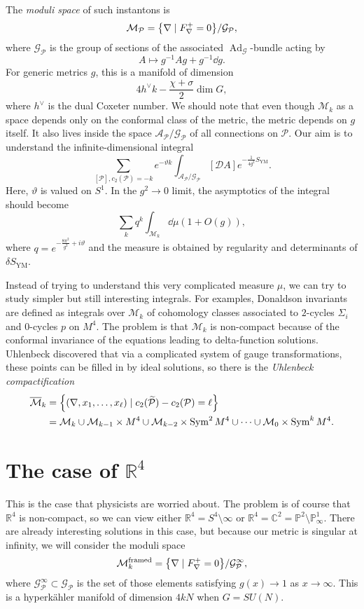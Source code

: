 \documentclass[leqno, openany]{memoir}
\theoremstyle{definition}
\theoremstyle{remark}
\theoremstyle{plain}
\theoremstyle{definition}
\theoremstyle{remark}
\newcommand{\R}{\mathbb{R}}
\newcommand{\C}{\mathbb{C}}
\renewcommand{\P}{\mathbb{P}}
\newcommand{\mc}[1]{\mathcal{#1}}
\newcommand{\mr}[1]{\mathrm{#1}}
\newcommand{\on}[1]{\operatorname{#1}}
\newcommand{\ol}[1]{\overline{#1}}
\newcommand{\wt}[1]{\widetilde{#1}}
\DeclareMathOperator{\Ad}{Ad}
\begin{document}
The \textit{moduli space} of such instantons is
\[ \mc{M}_{\mc{P}} = \qty{\nabla \mid F_{\nabla}^+ = 0} / \mc{G}_{\mc{P}}, \]
where $\mc{G}_{\mc{P}}$ is the group of sections of the associated $\Ad_{\mc{G}}$-bundle acting by
\[ A \mapsto g^{-1} A g + g^{-1} \dd g. \]
For generic metrics $g$, this is a manifold of dimension
\[ 4 h^{\vee} k - \frac{\chi + \sigma}{2} \dim G, \]
where $h^{\vee}$ is the dual Coxeter number. We should note that even though $\mc{M}_k$ as a space depends only on the conformal class of the metric, the metric depends on $g$ itself. It also lives inside the space $\mc{A}_{\mc{P}}/\mc{G}_{\mc{P}}$ of all connections on $\mc{P}$. Our aim is to understand the infinite-dimensional integral
\[ \sum_{[\mc{P}], c_2(\mc{P}) = -k} e^{- \vartheta k} \int_{\mc{A}_{\mc{P}}/\mc{G}_{\mc{P}}} [\mc{D}A] e^{-\frac{1}{4g^2} S_{\mr{YM}}}. \]
Here, $\vartheta$ is valued on $S^1$. In the $g^2 \to 0$ limit, the asymptotics of the integral should become
\[ \sum_k q^k \int_{\mc{M}_k} \dd{\mu} (1 + O(g)), \]
where $q = e^{-\frac{8\pi^2}{g^2} + i\vartheta}$ and the measure is obtained by regularity and determinants of $\delta S_{\mr{YM}}$.

Instead of trying to understand this very complicated measure $\mu$, we can try to study simpler but still interesting integrals. For examples, Donaldson invariants are defined as integrals over $\mc{M}_k$ of cohomology classes associated to $2$-cycles $\Sigma_i$ and $0$-cycles $p$ on $M^4$. The problem is that $\mc{M}_k$ is non-compact because of the conformal invariance of the equations leading to delta-function solutions. Uhlenbeck discovered that via a complicated system of gauge transformations, these points can be filled in by ideal solutions, so there is the \textit{Uhlenbeck compactification}
\begin{align*}
    \ol{\mc{M}}_k &= \qty{(\nabla, x_1, \ldots, x_{\ell}) \mid c_2(\wt{\mc{P}}) - c_2(\mc{P}) = \ell} \\
    &= \mc{M}_k \cup \mc{M}_{k-1} \times M^4 \cup \mc{M}_{k-2} \times \on{Sym}^2 M^4 \cup  \cdots \cup \mc{M}_0 \times \on{Sym}^k M^4.
\end{align*}

\section{The case of $\R^4$}

This is the case that physicists are worried about. The problem is of course that $\R^4$ is non-compact, so we can view either $\R^4 = S^4 \setminus \infty$ or $\R^4 = \C^2 = \P^2 \setminus \P^1_{\infty}$. There are already interesting solutions in this case, but because our metric is singular at infinity, we will consider the moduli space
\[ \mc{M}_k^{\mr{framed}} = \qty{\nabla \mid F_{\nabla}^+ = 0} / \mc{G}_{\mc{P}}^{\infty}, \]
where $\mc{G}_{\mc{P}}^{\infty} \subset \mc{G}_{\mc{P}}$ is the set of those elements satisfying $g(x) \to 1$ as $x \to \infty$. This is a hyperk\"ahler manifold of dimension $4kN$ when $G = SU(N)$.
\end{document}
